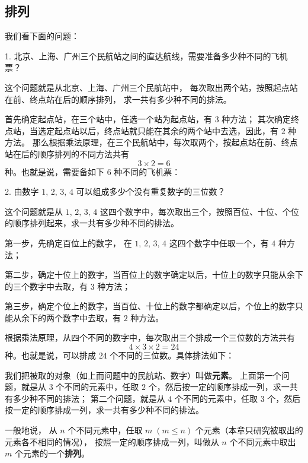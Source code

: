 \subsection{排列}\label{subsec:2-2}

我们看下面的问题：

1. 北京、上海、广州三个民航站之间的直达航线，需要准备多少种不同的飞机票？

这个问题就是从北京、上海、广州三个民航站中， 每次取出两个站，按照起点站在前、终点站在后的顺序排列，
求一共有多少种不同的排法。

首先确定起点站，在三个站中，任选一个站为起点站，有 $3$ 种方法；
其次确定终点站，当选定起点站以后，终点站就只能在其余的两个站中去选，因此，有 $2$ 种方法。
那么根据乘法原理，在三个民航站中，每次取两个，按起点站在前、终点站在后的顺序排列的不同方法共有
$$ 3 \times 2 = 6 $$
种。也就是说，需要备如下 $6$ 种不同的飞机票：

\begin{figure}[htbp]
    \centering
    
\end{figure}


2. 由数字 $1,\, 2,\, 3,\, 4$ 可以组成多少个没有重复数字的三位数？

这个问题就是从 $1,\, 2,\, 3,\, 4$ 这四个数字中，每次取出三个，按照百位、十位、个位的顺序排列起来，求一共有多少种不同的排法。

第一步，先确定百位上的数字， 在 $1,\, 2,\, 3,\, 4$ 这四个数字中任取一个，有 $4$ 种方法；

第二步，确定十位上的数字，当百位上的数字确定以后，十位上的数字只能从余下的三个数字中去取，有 $3$ 种方法；

第三步，确定个位上的数字，当百位、十位上的数字都确定以后，个位上的数字只能从余下的两个数字中去取，有 $2$ 种方法。

根据乘法原理，从四个不同的数字中，每次取出三个排成一个三位数的方法共有
$$ 4 \times 3 \times 2 = 24 $$
种。也就是说，可以排成 $24$ 个不同的三位数。具体排法如下：

\begin{figure}[htbp]
    \centering
    
\end{figure}

我们把被取的对象（如上而问题中的民航站、数字）叫做\textbf{元素}。
上面第一个问题，就是从 $3$ 个不同的元素中，任取 $2$ 个，然后按一定的顺序排成一列，求一共有多少种不同的排法；
    第二个问题，就是从 $4$ 个不同的元素中，任取 $3$ 个，然后按一定的顺序排成一列，求一共有多少种不同的排法。

一般地说， 从 $n$ 个不同元素中，任取 $m \; (m \leqslant n)$ 个元素（本章只研究被取出的元素各不相同的情况），
按照一定的顺序排成一列，叫做从 $n$ 个不同元素中取出 $m$ 个元素的一个\textbf{排列}。

